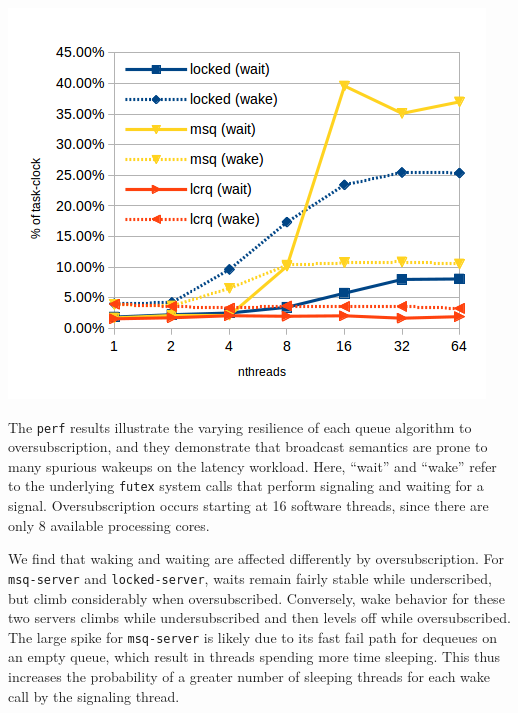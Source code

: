 \documentclass[twoside,10pt]{article}
\newenvironment{Figure}
  {\par\medskip\noindent\minipage{\linewidth}}
  {\endminipage\par\medskip}
\begin{document}
\begin{multicols}{2}
\begin{Figure}
\includegraphics[width=\linewidth]{img/perf-latency-nthreads.png}
\label{fig:perf-latency-nthreads}
\end{Figure}

The \verb+perf+ results illustrate the varying resilience of each
queue algorithm to oversubscription, and they demonstrate that
broadcast semantics are prone to many spurious wakeups on the latency
workload. Here, ``wait'' and ``wake'' refer to the underlying
\verb+futex+ system calls that perform signaling and waiting for a
signal. Oversubscription occurs starting at 16 software threads, since
there are only 8 available processing cores. 

We find that waking and waiting are affected differently by
oversubscription. For \verb+msq-server+ and \verb+locked-server+,
waits remain fairly stable while underscribed, but climb considerably
when oversubscribed. Conversely, wake behavior for these two servers
climbs while undersubscribed and then levels off while
oversubscribed. The large spike for \verb+msq-server+ is likely due to
its fast fail path for dequeues on an empty queue, which result in
threads spending more time sleeping. This thus increases the
probability of a greater number of sleeping threads for each wake call
by the signaling thread.


\end{multicols}
\end{document}
